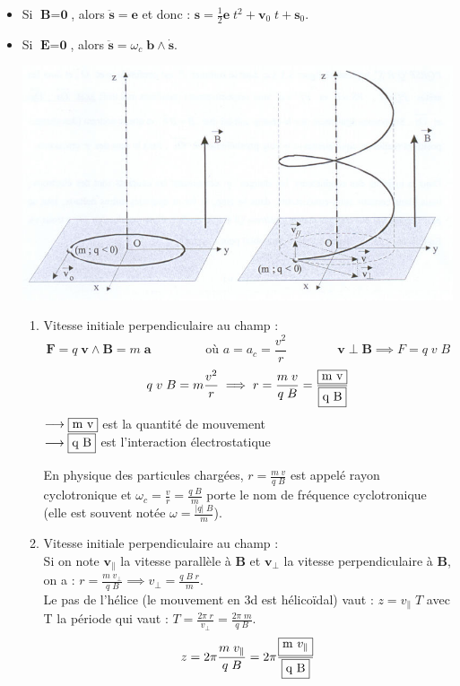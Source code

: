\documentclass[a4paper]{article}
\begin{document}
\begin{itemize}
\item Si $ \textbf{B} = \textbf{0} $, alors $ \ddot{\textbf{s}} = \textbf{e} $ et donc : $\displaystyle \textbf{s} = \frac{1}{2} \textbf{e} \; t^2 + \textbf{v}_0 \; t + \textbf{s}_0 $.





\item Si $ \textbf{E} = \textbf{0} $, alors $ \ddot{\textbf{s}} = \omega_c \; \textbf{b} \wedge \dot{\textbf{s}} $.
\begin{center}
\includegraphics{images/Trajectoire.jpg}
\end{center}

\begin{enumerate}
\item Vitesse initiale perpendiculaire au champ : 
\[ \textbf{F} = q \; \textbf{v} \wedge \textbf{B} = m \; \textbf{a} \qquad \qquad \text{ où } a = a_c = \frac{v^2}{r} \qquad \qquad \textbf{v} \perp \textbf{B} \implies F = q \; v \; B \]
\[ q \; v \; B = m \frac{v^2}{r} \implies r = \frac{m \; v}{q \; B} = \frac{\fbox{m v}}{\fbox{q B}} \]
$\displaystyle \longrightarrow \fbox{m v} $ est la quantité de mouvement \\
$\displaystyle \longrightarrow \fbox{q B} $ est l'interaction électrostatique

En physique des particules chargées, $\displaystyle r = \frac{m \; v}{q \; B} $ est appelé rayon cyclotronique et $\displaystyle \omega_c = \frac{v}{r} = \frac{q \; B}{m} $ porte le nom de fréquence cyclotronique (elle est souvent notée $ \omega = \frac{|q| \; B}{m} $).
\item Vitesse initiale perpendiculaire au champ : \\
Si on note $ \textbf{v}_{\parallel} $ la vitesse parallèle à $ \textbf{B} $ et $ \textbf{v}_{\perp} $ la vitesse perpendiculaire à $ \textbf{B} $, on a : $\displaystyle r = \frac{m \; v_\perp}{q \; B} \implies v_\perp = \frac{q \; B \; r}{m} $. \\
Le pas de l'hélice (le mouvement en 3d est hélicoïdal) vaut : $\displaystyle z = v_\parallel \; T $ avec T la période qui vaut : $\displaystyle T = \frac{2 \pi \; r}{v_\perp} = \frac{2 \pi \; m}{q \; B} $.
\[ z = 2 \pi \frac{m \; v_\parallel}{q \; B} = 2 \pi \frac{\fbox{m $ v_\parallel $}}{\fbox{q B}} \]
\end{enumerate}






\end{itemize}
\end{document}
